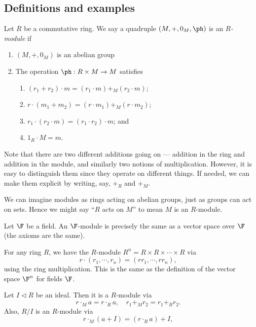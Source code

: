 \documentclass[a4paper]{article}
\begin{document}
\subsection{Definitions and examples}
\begin{defi}[Module]
  Let $R$ be a commutative ring. We say a quadruple $(M, +, 0_M, \ph)$ is an \emph{$R$-module} if
  \begin{enumerate}
    \item $(M, +, 0_M)$ is an abelian group
    \item The operation $\ph: R \times M \to M$ satisfies
      \begin{enumerate}
        \item $(r_1 + r_2) \cdot m = (r_1 \cdot m) +_M (r_2 \cdot m)$;
        \item $r\cdot (m_1 + m_2) = (r\cdot m_1) +_M (r\cdot m_2)$;
        \item $r_1 \cdot (r_2 \cdot m) = (r_1 \cdot r_2) \cdot m$; and
        \item $1_R \cdot M = m$.
      \end{enumerate}
  \end{enumerate}
\end{defi}
Note that there are two different additions going on --- addition in the ring and addition in the module, and similarly two notions of multiplication. However, it is easy to distinguish them since they operate on different things. If needed, we can make them explicit by writing, say, $+_R$ and $+_M$.

We can imagine modules as rings acting on abelian groups, just as groups can act on sets. Hence we might say ``$R$ acts on $M$'' to mean $M$ is an $R$-module.

\begin{eg}
  Let $\F$ be a field. An $\F$-module is precisely the same as a vector space over $\F$ (the axioms are the same).
\end{eg}

\begin{eg}
  For any ring $R$, we have the $R$-module $R^n = R \times R \times \cdots \times R$ via
  \[
    r\cdot (r_1, \cdots, r_n) = (rr_1, \cdots, rr_n),
  \]
  using the ring multiplication. This is the same as the definition of the vector space $\F^n$ for fields $\F$.
\end{eg}

\begin{eg}
  Let $I \lhd R$ be an ideal. Then it is a $R$-module via
  \[
    r \cdot_M a = r\cdot_R a,\quad r_1 +_M r_2 = r_1 +_R r_2.
  \]
  Also, $R/I$ is an $R$-module via
  \[
    r\cdot_M (a + I) = (r\cdot_R a) + I,
  \]
\end{eg}
\end{document}
